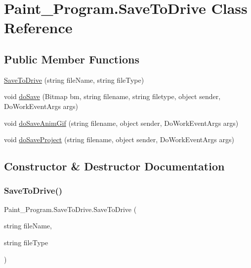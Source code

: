 \hypertarget{class_paint___program_1_1_save_to_drive}{}\section{Paint\+\_\+\+Program.\+Save\+To\+Drive Class Reference}
\label{class_paint___program_1_1_save_to_drive}
\subsection*{Public Member Functions}
\begin{DoxyCompactItemize}
\item 
\mbox{\hyperlink{class_paint___program_1_1_save_to_drive_aa5f7d65ca88d6e2dcb07a59dbd118fce}{Save\+To\+Drive}} (string file\+Name, string file\+Type)
\item 
void \mbox{\hyperlink{class_paint___program_1_1_save_to_drive_a57ff1c0b94b46731df43a04f2eb28f07}{do\+Save}} (Bitmap bm, string filename, string filetype, object sender, Do\+Work\+Event\+Args args)
\item 
void \mbox{\hyperlink{class_paint___program_1_1_save_to_drive_a10a9b341d476f9f773e72c0551545aff}{do\+Save\+Anim\+Gif}} (string filename, object sender, Do\+Work\+Event\+Args args)
\item 
void \mbox{\hyperlink{class_paint___program_1_1_save_to_drive_a76739416bfdb48941e22807b8ae03dea}{do\+Save\+Project}} (string filename, object sender, Do\+Work\+Event\+Args args)
\end{DoxyCompactItemize}


\subsection{Constructor \& Destructor Documentation}
\mbox{\label{class_paint___program_1_1_save_to_drive_aa5f7d65ca88d6e2dcb07a59dbd118fce}} 
\subsubsection{\texorpdfstring{Save\+To\+Drive()}{SaveToDrive()}}
{\footnotesize\ttfamily Paint\+\_\+\+Program.\+Save\+To\+Drive.\+Save\+To\+Drive (\begin{DoxyParamCaption}\item[{string}]{file\+Name,  }\item[{string}]{file\+Type }\end{DoxyParamCaption})\hspace{0.3cm}{\ttfamily [inline]}}




